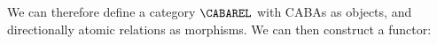 We can therefore define a category \(\CABAREL\) with CABAs as objects, and
directionally atomic relations as morphisms. We can then construct a functor:

%
%
%
%   

